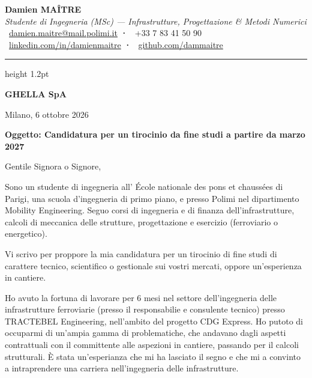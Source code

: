 \documentclass[a4paper,11pt]{extarticle}
\newcommand{\azienda}{GHELLA SpA}
\begin{document}
\begin{center}
  {\LARGE\bfseries\color{accent} Damien MAÎTRE}\\[2pt]
  {\normalsize\textit{\textcolor{muted}{Studente di Ingegneria (MSc) — Infrastrutture, Progettazione \& Metodi Numerici}}}\\[4pt]
  \small
  \textcolor{muted}{
    \faEnvelope\ \href{mailto:damien.maitre@mail.polimi.it}{damien.maitre@mail.polimi.it}
    \quad\textbf{·}\quad
    \faPhone\ +33 7 83 41 50 90
    \\[1pt]
    \faLinkedin\ \href{https://linkedin.com/in/damienmaitre}{linkedin.com/in/damienmaitre}
    \quad\textbf{·}\quad
    \faGithub\ \href{https://github.com/dammaitre}{github.com/dammaitre}
  }
\end{center}

\vspace{2pt}
{\color{accent}\hrule height 1.2pt}
\vspace{10pt}

\begin{flushright}
  \textbf{\azienda}\\
\end{flushright}

\vspace{4pt}
Milano, 6 ottobre 2026

\vspace{4pt}
{\color{accent}\textbf{Oggetto: Candidatura per un tirocinio da fine studi a partire da marzo 2027}}

\vspace{4pt}
Gentile Signora o Signore,

Sono un studente di ingegneria all' École nationale des pons et chaussées di Parigi, una scuola d'ingegneria di primo piano, e presso Polimi nel dipartimento Mobility Engineering. Seguo corsi di ingegneria e di finanza dell'infrastrutture, calcoli di meccanica delle strutture, progettazione e esercizio (ferroviario o energetico). 

Vi scrivo per proppore la mia candidatura per un tirocinio di fine studi di carattere tecnico, scientifico o gestionale sui vostri mercati, oppore un'esperienza in cantiere.

Ho avuto la fortuna di lavorare per 6 mesi nel settore dell'ingegneria delle infrastrutture ferroviarie (presso il responsabilie e consulente tecnico) presso TRACTEBEL Engineering, nell'ambito del progetto CDG Express. Ho putoto di occuparmi di un'ampia gamma di problematiche, che andavano dagli aspetti contrattuali con il committente alle aspezioni in cantiere, passando per il calcoli strutturali. È stata un'esperianza che mi ha lasciato il segno e che mi a convinto a intraprendere una carriera nell'ingegneria delle infrastrutture.
\end{document}
